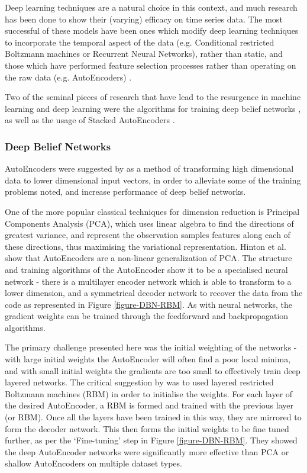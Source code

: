 \documentclass[a4paper,11pt,oneside]{article}
\theoremstyle{plain}
\theoremstyle{definition}
\begin{document}
	Deep learning techniques are a natural choice in this context, and much research has been done to show their 
	(varying) efficacy on time series data. The most successful of these models have been ones which modify deep 
	learning techniques to incorporate the temporal aspect of the data (e.g. Conditional restricted Boltzmann 
	machines or Recurrent Neural Networks), rather than static, and those which have performed feature selection
	processes rather than operating on the raw data (e.g. AutoEncoders) \citep{Langkvist}. 
	\hfill \break 
	
	
	Two of the seminal pieces of research that have lead to the resurgence in machine learning and deep learning 
	were the algorithms for training deep belief networks \citep{Hinton1}, as well as the usage of Stacked AutoEncoders \citep{Ranzato1, Bengio1}. 
	
	
	\subsubsection{Deep Belief Networks}\label{DBN}
	
	AutoEncoders were suggested by \citet{Hinton2} as a method of transforming high dimensional 
	data to lower dimensional input vectors, in order to alleviate some of the training problems noted, and increase 
	performance of deep belief networks.
	\hfill \break 
	
	One of the more popular classical techniques for dimension reduction is Principal Components Analysis (PCA), 
	which uses linear algebra to find the directions of greatest variance, and represent the observation samples 
	features along each of these directions, thus maximising the variational representation. Hinton et al. show that 
	AutoEncoders are a non-linear generalization of PCA. The structure and training algorithms of the AutoEncoder 
	show it to be a specialised neural network - there is a multilayer encoder network which is able to transform to a 
	lower dimension, and a symmetrical decoder network to recover the data from the code as represented in Figure \ref{figure-DBN-RBM}. As with 
	neural networks, the gradient weights can be trained through the feedforward and backpropagation algorithms.  
	\hfill \break 
	
	The primary challenge presented here was the initial weighting of the networks - with large initial weights the 
	AutoEncoder will often find a poor local minima, and with small initial weights the gradients are too small to 
	effectively train deep layered networks. The critical suggestion by \citet{Hinton3} was to used layered restricted 
	Boltzmann machines (RBM) in order to initialise the weights. For each layer of the desired AutoEncoder, a RBM is 
	formed and trained with the previous layer (or RBM). Once all the layers have been 
	trained in this way, they are mirrored to form the decoder network. This then forms the initial weights to be fine 
	tuned further, as per the `Fine-tuning' step in Figure \ref{figure-DBN-RBM}. They showed the deep AutoEncoder networks were significantly more 
	effective than PCA or shallow AutoEncoders on multiple dataset types.
	
\end{document}
